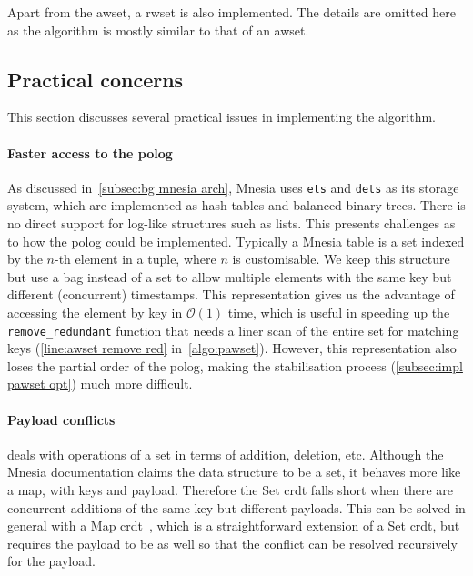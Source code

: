 Apart from the \acrlong{awset}, a \acrlong{rwset} is also implemented. The details
are omitted here as the algorithm is mostly similar to that of an \acrlong{awset}.

\subsection{Practical concerns} \label{subsec:impl practical}

This section discusses several practical issues in implementing the algorithm.

\paragraph{Faster access to the \acrshort{polog}}

As discussed in~\cref{subsec:bg mnesia arch}, Mnesia uses \texttt{ets} and \texttt{dets}
as its storage system, which are implemented as hash tables and balanced binary trees.
There is no direct support for log-like structures such as lists. This
presents challenges as to how the \acrshort{polog} could be implemented. Typically
a Mnesia table is a set indexed by the \(n\)-th element in a tuple, where \(n\) 
is customisable. We keep this structure but use a bag instead of a set to allow
multiple elements with the same key but different (concurrent) timestamps. 
This representation gives us the advantage of accessing the element by key 
in \(\mathcal O(1)\) time, which is useful in speeding
up the \verb|remove_redundant| function that needs a liner scan of the entire set
for matching keys (\cref{line:awset remove red} in~\cref{algo:pawset}).
However, this representation also loses the partial order of the
\acrshort{polog}, making the stabilisation process (\cref{subsec:impl pawset opt}) 
much more difficult. 


\paragraph{Payload conflicts}

 deals with operations of a set in terms of addition, deletion,
etc. Although the Mnesia documentation claims the data structure to be a set,
it behaves more like a map, with keys and payload. 
Therefore the Set \acrshort{crdt}
falls short when there are concurrent additions of the same key but different
payloads. This can be solved in general with a Map \acrshort{crdt}~\cite{shapiro2011CRDT}, 
which is a straightforward extension of a Set \acrshort{crdt}, but requires the
payload to be  as well so that the conflict can be resolved
recursively for the payload.

